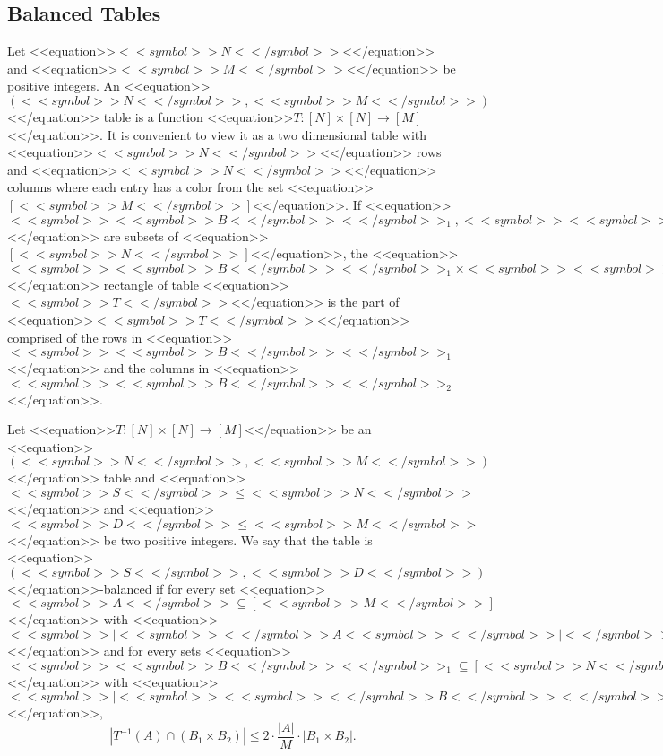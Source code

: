 \documentclass[proceedings]{stacs}
\def\mapping{\rightarrow}
\begin{document}
\subsection{Balanced Tables}
\label{s:balanced}
Let <<equation>>$<<symbol>>N<</symbol>>$<</equation>> and <<equation>>$<<symbol>>M<</symbol>>$<</equation>> be positive integers. An <<equation>>$(<<symbol>>N<</symbol>>, <<symbol>>M<</symbol>>)$<</equation>> table is a function <<equation>>$T:[N] \times [N] \mapping [M]$<</equation>>. It is convenient to view it as a two dimensional table with <<equation>>$<<symbol>>N<</symbol>>$<</equation>> rows and <<equation>>$<<symbol>>N<</symbol>>$<</equation>> columns where each entry has a color from the set <<equation>>$[<<symbol>>M<</symbol>>]$<</equation>>. If <<equation>>$<<symbol>><<symbol>>B<</symbol>><</symbol>>_1, <<symbol>><<symbol>>B<</symbol>><</symbol>>_2$<</equation>> are subsets of <<equation>>$[<<symbol>>N<</symbol>>]$<</equation>>, the <<equation>>$<<symbol>><<symbol>>B<</symbol>><</symbol>>_1 \times <<symbol>><<symbol>>B<</symbol>><</symbol>>_2$<</equation>> rectangle of table <<equation>>$<<symbol>>T<</symbol>>$<</equation>> is the part of <<equation>>$<<symbol>>T<</symbol>>$<</equation>> comprised of the rows in <<equation>>$<<symbol>><<symbol>>B<</symbol>><</symbol>>_1$<</equation>> and the columns in <<equation>>$<<symbol>><<symbol>>B<</symbol>><</symbol>>_2$<</equation>>.
\begin{definition}
\label{d:balancedtable}
Let <<equation>>$T: [N] \times [N] \mapping [M]$<</equation>> be an <<equation>>$(<<symbol>>N<</symbol>>,<<symbol>>M<</symbol>>)$<</equation>> table and <<equation>>$<<symbol>>S<</symbol>> \leq <<symbol>>N<</symbol>>$<</equation>> and <<equation>>$<<symbol>>D<</symbol>> \leq <<symbol>>M<</symbol>>$<</equation>> be two positive integers. We say that the table is <<equation>>$(<<symbol>>S<</symbol>>, <<symbol>>D<</symbol>>)$<</equation>>-balanced if for every set <<equation>>$<<symbol>>A<</symbol>> \subseteq [<<symbol>>M<</symbol>>]$<</equation>> with <<equation>>$<<symbol>>|<<symbol>><</symbol>>A<<symbol>><</symbol>>|<</symbol>> = <<symbol>>M<<symbol>><</symbol>>/<<symbol>><</symbol>>D<</symbol>>$<</equation>> and for every sets <<equation>>$<<symbol>><<symbol>>B<</symbol>><</symbol>>_1 \subseteq [<<symbol>>N<</symbol>>], <<symbol>><<symbol>>B<</symbol>><</symbol>>_2 \subseteq [<<symbol>>N<</symbol>>]$<</equation>> with <<equation>>$<<symbol>>|<<symbol>><<symbol>><</symbol>>B<</symbol>><</symbol>>_1<<symbol>>|<</symbol>> \geq <<symbol>>S<</symbol>>, <<symbol>>|<<symbol>><<symbol>><</symbol>>B<</symbol>><</symbol>>_2<<symbol>>|<</symbol>> \geq <<symbol>>S<</symbol>>$<</equation>>,
\[
| T^{-1}(A) \cap (B_1 \times B_2) | \leq 2 \cdot \frac{|A|}{M} \cdot |B_1 \times B_2|.
\]
\end{definition}
\end{document}
